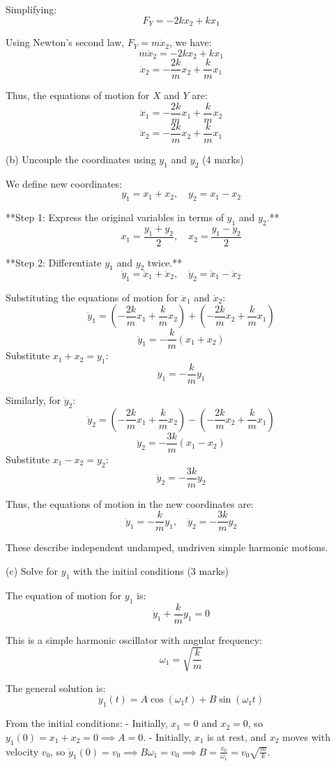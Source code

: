 Simplifying:
\[
F_Y = -2k x_2 + k x_1
\]

Using Newton's second law, $F_Y = m \ddot{x}_2$, we have:
\[
m \ddot{x}_2 = -2k x_2 + k x_1
\]
\[
\ddot{x}_2 = -\frac{2k}{m} x_2 + \frac{k}{m} x_1
\]

Thus, the equations of motion for $X$ and $Y$ are:
\[
\ddot{x}_1 = -\frac{2k}{m} x_1 + \frac{k}{m} x_2
\]
\[
\ddot{x}_2 = -\frac{2k}{m} x_2 + \frac{k}{m} x_1
\]

(b) Uncouple the coordinates using $y_1$ and $y_2$ (4 marks)

We define new coordinates:
\[
y_1 = x_1 + x_2, \quad y_2 = x_1 - x_2
\]

**Step 1: Express the original variables in terms of $y_1$ and $y_2$.**
\[
x_1 = \frac{y_1 + y_2}{2}, \quad x_2 = \frac{y_1 - y_2}{2}
\]

**Step 2: Differentiate $y_1$ and $y_2$ twice.**
\[
\ddot{y}_1 = \ddot{x}_1 + \ddot{x}_2, \quad \ddot{y}_2 = \ddot{x}_1 - \ddot{x}_2
\]

Substituting the equations of motion for $\ddot{x}_1$ and $\ddot{x}_2$:
\[
\ddot{y}_1 = \left(-\frac{2k}{m} x_1 + \frac{k}{m} x_2\right) + \left(-\frac{2k}{m} x_2 + \frac{k}{m} x_1\right)
\]
\[
\ddot{y}_1 = -\frac{k}{m}(x_1 + x_2)
\]
Substitute $x_1 + x_2 = y_1$:
\[
\ddot{y}_1 = -\frac{k}{m} y_1
\]

Similarly, for $\ddot{y}_2$:
\[
\ddot{y}_2 = \left(-\frac{2k}{m} x_1 + \frac{k}{m} x_2\right) - \left(-\frac{2k}{m} x_2 + \frac{k}{m} x_1\right)
\]
\[
\ddot{y}_2 = -\frac{3k}{m}(x_1 - x_2)
\]
Substitute $x_1 - x_2 = y_2$:
\[
\ddot{y}_2 = -\frac{3k}{m} y_2
\]

Thus, the equations of motion in the new coordinates are:
\[
\ddot{y}_1 = -\frac{k}{m} y_1, \quad \ddot{y}_2 = -\frac{3k}{m} y_2
\]

These describe independent undamped, undriven simple harmonic motions.

(c) Solve for $y_1$ with the initial conditions (3 marks)

The equation of motion for $y_1$ is:
\[
\ddot{y}_1 + \frac{k}{m} y_1 = 0
\]

This is a simple harmonic oscillator with angular frequency:
\[
\omega_1 = \sqrt{\frac{k}{m}}
\]

The general solution is:
\[
y_1(t) = A \cos(\omega_1 t) + B \sin(\omega_1 t)
\]

From the initial conditions:
- Initially, $x_1 = 0$ and $x_2 = 0$, so $y_1(0) = x_1 + x_2 = 0 \implies A = 0$.
- Initially, $x_1$ is at rest, and $x_2$ moves with velocity $v_0$, so $\dot{y}_1(0) = v_0 \implies B \omega_1 = v_0 \implies B = \frac{v_0}{\omega_1} = v_0 \sqrt{\frac{m}{k}}$.

